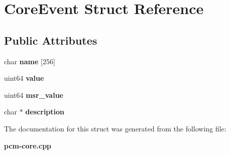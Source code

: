 \section{Core\+Event Struct Reference}
\label{structCoreEvent}
\subsection*{Public Attributes}
\begin{DoxyCompactItemize}
\item 
\mbox{\label{structCoreEvent_adfc317377ca5e570e76cefb0bcb956a7}} 
char {\bfseries name} [256]
\item 
\mbox{\label{structCoreEvent_aee18e455c55f0af436f9232e80eba77d}} 
uint64 {\bfseries value}
\item 
\mbox{\label{structCoreEvent_a6bea66846abee2af316f5c38069d0768}} 
uint64 {\bfseries msr\+\_\+value}
\item 
\mbox{\label{structCoreEvent_a938a4c4c72139b70a6a647698e4a2121}} 
char $\ast$ {\bfseries description}
\end{DoxyCompactItemize}


The documentation for this struct was generated from the following file\+:\begin{DoxyCompactItemize}
\item 
\textbf{ pcm-\/core.\+cpp}\end{DoxyCompactItemize}
